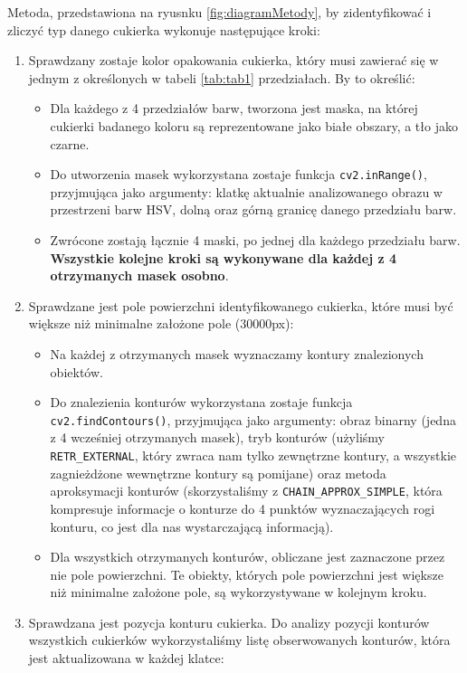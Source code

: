 \documentclass{article}
\begin{document}
Metoda, przedstawiona na ryusnku \ref{fig:diagramMetody}, by zidentyfikować i zliczyć typ danego cukierka wykonuje następujące kroki:
\begin{enumerate}
    \item Sprawdzany zostaje kolor opakowania cukierka, który musi zawierać się w jednym z określonych w tabeli \ref{tab:tab1} przedziałach. By to określić:
    \begin{itemize}
        \item Dla każdego z 4 przedziałów barw, tworzona jest maska, na której cukierki badanego koloru są reprezentowane jako białe obszary, a tło jako czarne.
        \item Do utworzenia masek wykorzystana zostaje funkcja \verb|cv2.inRange()|\cite{inRange}, przyjmująca jako argumenty: klatkę aktualnie analizowanego obrazu w przestrzeni barw HSV, dolną oraz górną granicę danego przedziału barw.
        \item Zwrócone zostają łącznie 4 maski, po jednej dla każdego przedziału barw. \textbf{Wszystkie kolejne kroki są wykonywane dla każdej z 4 otrzymanych masek osobno}.
    \end{itemize}
    \item Sprawdzane jest pole powierzchni identyfikowanego cukierka, które musi być większe niż minimalne założone pole (30000px):
    \begin{itemize}
        \item Na każdej z otrzymanych masek wyznaczamy kontury znalezionych obiektów.
        \item Do znalezienia konturów wykorzystana zostaje funkcja \verb|cv2.findContours()|\cite{findContours}, przyjmująca jako argumenty: obraz binarny (jedna z 4 wcześniej otrzymanych masek), tryb konturów (użyliśmy \verb|RETR_EXTERNAL|\cite{retrExternal}, który zwraca nam tylko zewnętrzne kontury, a wszystkie zagnieżdżone wewnętrzne kontury są pomijane) oraz metoda aproksymacji konturów (skorzystaliśmy z \verb|CHAIN_APPROX_SIMPLE|\cite{chainApproxSimble}, która kompresuje informacje o konturze do 4 punktów wyznaczających rogi konturu, co jest dla nas wystarczającą informacją).
        \item Dla wszystkich otrzymanych konturów, obliczane jest zaznaczone przez nie pole powierzchni. Te obiekty, których pole powierzchni jest większe niż minimalne założone pole, są wykorzystywane w kolejnym kroku.
    \end{itemize}
    \item Sprawdzana jest pozycja konturu cukierka. Do analizy pozycji konturów wszystkich cukierków wykorzystaliśmy listę obserwowanych konturów, która jest aktualizowana w każdej klatce:

\end{enumerate}
\end{document}
